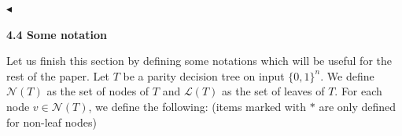 $\blacktriangleleft$\par






\par\medskip\noindent\textbf{
4.4 Some notation}\par




Let us finish this section by defining some notations which will be useful for the rest of the paper. Let $T$ be a parity decision tree on input $\{0,1\}^{n}$. We define $\mathcal{N}(T)$ as the set of nodes of $T$ and $\mathcal{L}(T)$ as the set of leaves of $T$. For each node $v\in\mathcal{N}(T)$, we define the following: (items marked with $\bm{*}$ are only defined for non-leaf nodes)\par


